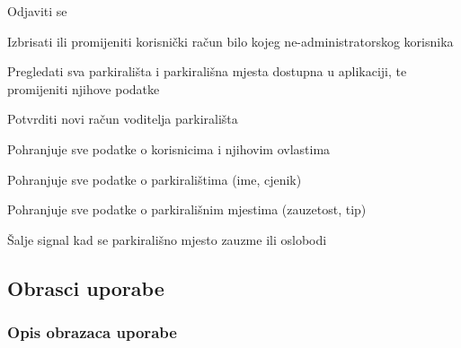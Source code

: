 \begin{packed_enum}
\begin{packed_enum}
				\end{packed_enum}
			
				\item  {}
				
				\begin{packed_enum}
					
					\item Odjaviti se
					\item Izbrisati ili promijeniti korisnički račun bilo kojeg ne-administratorskog korisnika
					\item Pregledati sva parkirališta i parkirališna mjesta dostupna u aplikaciji, te promijeniti njihove podatke
					\item Potvrditi novi račun voditelja parkirališta
					
				\end{packed_enum}
			
				\item  {}
				
				\begin{packed_enum}
					
					\item Pohranjuje sve podatke o korisnicima i njihovim ovlastima
					\item Pohranjuje sve podatke o parkiralištima (ime, cjenik)
					\item Pohranjuje sve podatke o parkirališnim mjestima (zauzetost, tip)
					
				\end{packed_enum}
			
				\item  {}
				
				\begin{packed_enum}
					
					\item Šalje signal kad se parkirališno mjesto zauzme ili oslobodi
					
				\end{packed_enum}
			\end{packed_enum}
			
			\eject 
			
			
				
			\subsection{Obrasci uporabe}
				
				\subsubsection{Opis obrazaca uporabe}
			
